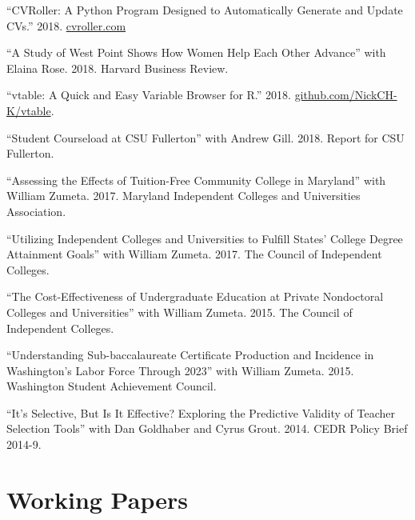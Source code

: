 \documentclass[11pt,a4paper,serif]{moderncv}
\begin{document}
 \begin{hangparas}{.25in}{1} 
 ``CVRoller: A Python Program Designed to Automatically Generate and Update CVs.'' 2018. \href{http://www.cvroller.com}{cvroller.com}



``A Study of West Point Shows How Women Help Each Other Advance'' with Elaina Rose. 2018. Harvard Business Review.



``vtable: A Quick and Easy Variable Browser for R.'' 2018. \href{https://www.github.com/NickCH-K/vtable}{github.com/NickCH-K/vtable}.



``Student Courseload at CSU Fullerton'' with Andrew Gill. 2018. Report for CSU Fullerton.



``Assessing the Effects of Tuition-Free Community College in Maryland'' with William Zumeta. 2017. Maryland Independent Colleges and Universities Association.



``Utilizing Independent Colleges and Universities to Fulfill States' College Degree Attainment Goals'' with William Zumeta. 2017. The Council of Independent Colleges.



``The Cost-Effectiveness of Undergraduate Education at Private Nondoctoral Colleges and Universities'' with William Zumeta. 2015. The Council of Independent Colleges.



``Understanding Sub-baccalaureate Certificate Production and Incidence in Washington's Labor Force Through 2023'' with William Zumeta. 2015. Washington Student Achievement Council.



``It's Selective, But Is It Effective? Exploring the Predictive Validity of Teacher Selection Tools'' with Dan Goldhaber and Cyrus Grout. 2014. CEDR Policy Brief 2014-9.

 
 \end{hangparas}


\section{Working Papers}  
  
\end{document}
